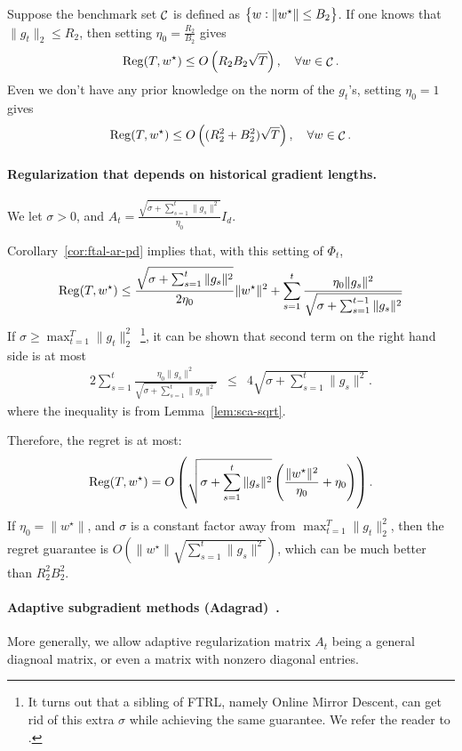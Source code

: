 \documentclass{article}
\DeclareMathOperator*{\Reg}{{\rm Reg}}
\DeclareMathOperator*{\Ccal}{{\cal C}}
\begin{document}
Suppose the benchmark set $\Ccal$ is defined as $\cbr{w: \| w^\star \| \leq B_2}$.
If one knows that $\| g_t \|_2 \leq R_2$, then setting $\eta_0 = \frac{R_2}{B_2}$ gives
\[ \Reg(T, w^\star) \leq O\del{R_2 B_2 \sqrt{T}}, \quad \forall w \in \Ccal. \]
Even we don't have any prior knowledge on the norm of the $g_t$'s, setting $\eta_0 = 1$ gives
\[ \Reg(T, w^\star) \leq O\del{(R_2^2 + B_2^2) \sqrt{T}}, \quad \forall w \in \Ccal. \]

\paragraph{Regularization that depends on historical gradient lengths.} We let $\sigma > 0$, and $A_t = \frac{\sqrt{\sigma + \sum_{s=1}^{t} \| g_s \|^2}}{\eta_0} I_d$.

Corollary~\ref{cor:ftal-ar-pd} implies that, with this setting of $\Phi_t$,
\[ \Reg(T, w^\star) \leq \frac{\sqrt{\sigma + \sum_{s=1}^{t} \| g_s \|^2}}{2 \eta_0} \| w^\star \|^2 + \sum_{s=1}^t \frac{\eta_0 \| g_s \|^2}{\sqrt{\sigma + \sum_{s=1}^{t-1} \| g_s \|^2}}\]
If $\sigma \geq \max_{t=1}^T \| g_t \|_2^2$~\footnote{It turns out that a sibling of FTRL, namely Online Mirror Descent, can get rid of this extra $\sigma$ while achieving the same guarantee. We refer the reader to \cite[][Lecture 5]{orabona2019introduction}.}, it can be shown that second term on the right hand side is at most
\begin{eqnarray*}
 2 \sum_{s=1}^t \frac{\eta_0 \| g_s \|^2}{\sqrt{\sigma + \sum_{s=1}^{t} \| g_s \|^2}}
&\leq& 4 \sqrt{\sigma + \sum_{s=1}^{t} \| g_s \|^2}.
\end{eqnarray*}
where the inequality is from Lemma~\ref{lem:sca-sqrt}.

Therefore, the regret is at most:
\begin{eqnarray*}
 \Reg(T, w^\star) = O\del{ \sqrt{\sigma + \sum_{s=1}^{t} \| g_s \|^2} \del{\frac{\|w^\star\|^2}{\eta_0} + \eta_0} }.
\end{eqnarray*}
If $\eta_0 = \| w^\star \|$, and $\sigma$ is a constant factor away from $\max_{t=1}^T \| g_t \|_2^2$, then the regret guarantee is $O(\|w^\star\| \sqrt{\sum_{s=1}^{t} \| g_s \|^2})$, which can be much better than $R_2^2 B_2^2$.


\paragraph{Adaptive subgradient methods (Adagrad)~\cite{duchi2011adaptive}.} More generally, we allow adaptive regularization matrix $A_t$ being a general diagnoal matrix, or even a matrix with nonzero diagonal entries.
\end{document}
